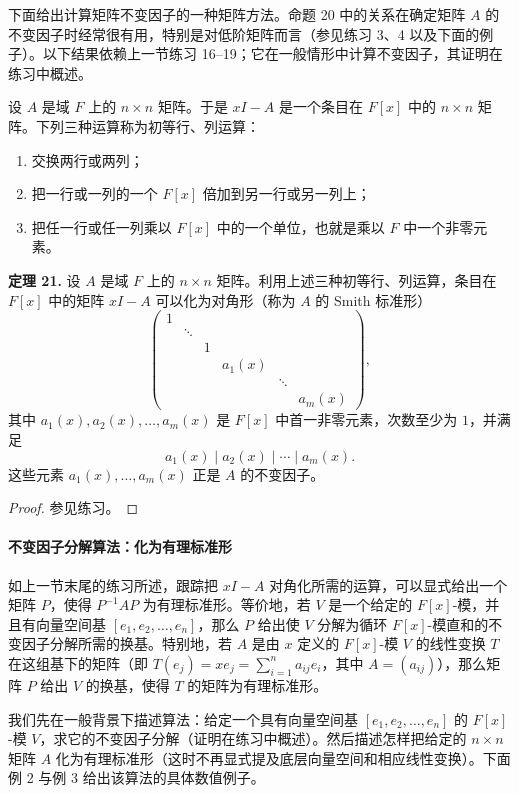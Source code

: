 下面给出计算矩阵不变因子的一种矩阵方法。命题 20 中的关系在确定矩阵 $A$ 的不变因子时经常很有用，特别是对低阶矩阵而言（参见练习 3、4 以及下面的例子）。以下结果依赖上一节练习 16--19；它在一般情形中计算不变因子，其证明在练习中概述。

设 $A$ 是域 $F$ 上的 $n\times n$ 矩阵。于是 $xI-A$ 是一个条目在 $F[x]$ 中的 $n\times n$ 矩阵。下列三种运算称为初等行、列运算：
\begin{enumerate}[label=(\alph*)]
\item 交换两行或两列；
\item 把一行或一列的一个 $F[x]$ 倍加到另一行或另一列上；
\item 把任一行或任一列乘以 $F[x]$ 中的一个单位，也就是乘以 $F$ 中一个非零元素。
\end{enumerate}

\noindent\textbf{定理 21.} 设 $A$ 是域 $F$ 上的 $n\times n$ 矩阵。利用上述三种初等行、列运算，条目在 $F[x]$ 中的矩阵 $xI-A$ 可以化为对角形（称为 $A$ 的 Smith 标准形）
\[
\begin{pmatrix}
1&&&&&\\
&\ddots&&&&\\
&&1&&&\\
&&&a_1(x)&&\\
&&&&\ddots&\\
&&&&&a_m(x)
\end{pmatrix},
\]
其中 $a_1(x),a_2(x),\ldots,a_m(x)$ 是 $F[x]$ 中首一非零元素，次数至少为 $1$，并满足
\[
a_1(x)\mid a_2(x)\mid\cdots\mid a_m(x).
\]
这些元素 $a_1(x),\ldots,a_m(x)$ 正是 $A$ 的不变因子。

\begin{proof}
参见练习。
\end{proof}

\paragraph{不变因子分解算法：化为有理标准形}
如上一节末尾的练习所述，跟踪把 $xI-A$ 对角化所需的运算，可以显式给出一个矩阵 $P$，使得 $P^{-1}AP$ 为有理标准形。等价地，若 $V$ 是一个给定的 $F[x]$-模，并且有向量空间基 $[e_1,e_2,\ldots,e_n]$，那么 $P$ 给出使 $V$ 分解为循环 $F[x]$-模直和的不变因子分解所需的换基。特别地，若 $A$ 是由 $x$ 定义的 $F[x]$-模 $V$ 的线性变换 $T$ 在这组基下的矩阵（即 $T(e_j)=xe_j=\sum_{i=1}^n a_{ij}e_i$，其中 $A=(a_{ij})$），那么矩阵 $P$ 给出 $V$ 的换基，使得 $T$ 的矩阵为有理标准形。

我们先在一般背景下描述算法：给定一个具有向量空间基 $[e_1,e_2,\ldots,e_n]$ 的 $F[x]$-模 $V$，求它的不变因子分解（证明在练习中概述）。然后描述怎样把给定的 $n\times n$ 矩阵 $A$ 化为有理标准形（这时不再显式提及底层向量空间和相应线性变换）。下面例 2 与例 3 给出该算法的具体数值例子。

